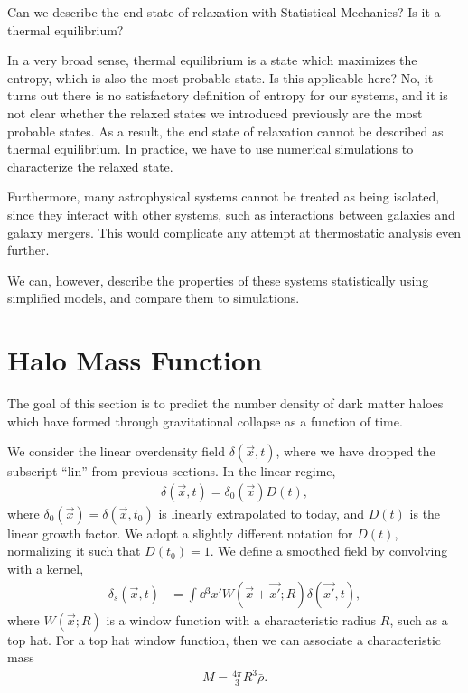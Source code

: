 Can we describe the end state of relaxation with Statistical Mechanics?
Is it a thermal equilibrium?

In a very broad sense, thermal equilibrium is a state which maximizes the entropy, which is also the most probable state.
Is this applicable here?
No, it turns out there is no satisfactory definition of entropy for our systems,
and it is not clear whether the relaxed states we introduced previously are the most probable states.
As a result, the end state of relaxation cannot be described as thermal equilibrium.
In practice, we have to use numerical simulations to characterize the relaxed state.

Furthermore, many astrophysical systems cannot be treated as being isolated, since they interact with other systems, such as interactions between galaxies and galaxy mergers.
This would complicate any attempt at thermostatic analysis even further.

We can, however, describe the properties of these systems statistically using simplified models, and compare them to simulations.


\section{Halo Mass Function}

The goal of this section is to predict the number density of dark matter haloes which have formed through gravitational collapse as a function of time.

We consider the linear overdensity field $\delta(\vec{x}, t)$, where we have dropped the subscript \enquote{$\text{lin}$} from previous sections.
In the linear regime, 
\begin{align*}
	\delta(\vec{x},t) = \delta_0(\vec{x}) D(t),
\end{align*}
where $\delta_0(\vec{x}) = \delta(\vec{x}, t_0)$ is linearly extrapolated to today, and $D(t)$ is the linear growth factor.
We adopt a slightly different notation for $D(t)$, normalizing it such that $D(t_0) = 1$.
We define a smoothed field by convolving with a kernel,
\begin{align*}
	\delta_s(\vec{x}, t)
	&= \int \dd{^3 x'} W(\vec{x}+\vec{x'}; R) \delta(\vec{x'}, t),
\end{align*}
where $W(\vec{x}; R)$ is a window function with a characteristic radius $R$, such as a top hat.
For a top hat window function, then we can associate a characteristic mass
\begin{align*}
	M = \frac{4\pi}{3} R^3 \bar{\rho}.
\end{align*}

